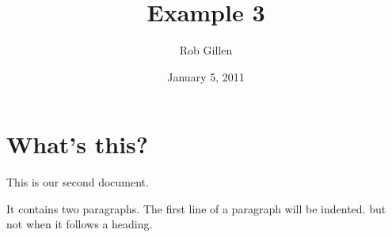 \documentclass[a4paper,11pt]{article}
\begin{document}
\title{Example 3}
\author{Rob Gillen}
\date{January 5, 2011}
\maketitle
\section{What's this?}
This     is      our 
second document. 

It contains two paragraphs. The first line of a paragraph will be indented. but not when it follows a heading.
\end{document}
